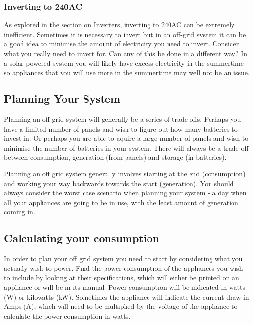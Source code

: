 \documentclass{article}
\theoremstyle{definition}
\theoremstyle{definition}
\theoremstyle{remark}
\begin{document}

    \subsubsection{Inverting to 240AC} %
    \label{ssub:inverting_to_240ac}

      As explored in the section on Inverters, inverting to 240AC can be extremely inefficient. Sometimes it is necessary to invert but in an off-grid system it can be a good idea to minimise the amount of electricity you need to invert. Consider what you really need to invert for. Can any of this be done in a different way? In a solar powered system you will likely have excess electricity in the summertime so appliances that you will use more in the summertime may well not be an issue.
    
  

  \subsection{Planning Your System} %
  \label{sub:planning_your_system}

    Planning an off-grid system will generally be a series of trade-offs. Perhaps you have a limited number of panels and wish to figure out how many batteries to invest in. Or perhaps you are able to aquire a large number of panels and wish to minimise the number of batteries in your system. There will always be a trade off between consumption, generation (from panels) and storage (in batteries). 

    Planning an off grid system generally involves starting at the end (consumption) and working your way backwards towards the start (generation). You should always consider the worst case scenario when planning your system - a day when all your appliances are going to be in use, with the least amount of generation coming in.
  

  \subsection{Calculating your consumption} %
  \label{sub:calculating_your_consumption}

    In order to plan your off grid system you need to start by considering what you actually wish to power. Find the power consumption of the appliances you wish to include by looking at their specifications, which will either be printed on an appliance or will be in its manual. Power consumption will be indicated in watts (W) or kilowatts (kW). Sometimes the appliance will indicate the current draw in Amps (A), which will need to be multiplied by the voltage of the appliance to calculate the power consumption in watts.
\end{document}
